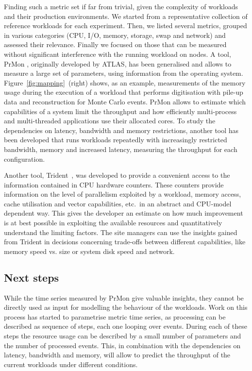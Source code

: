 Finding such a metric set if far from trivial, given the complexity of
workloads and their production environments. We started from a
representative collection of reference workloads for each experiment.
Then, we listed several metrics, grouped in various categories (CPU,
I/O, memory, storage, swap and network) and assessed their
relevance. Finally we focused on those that can be measured without
significant interference with the running workload on nodes. A tool,
PrMon \cite{prmon}, originally developed by ATLAS, has been
generalised and allows to measure a large set of parameters, using
information from the operating
system. Figure~\ref{fig:mapping}~(right) shows, as an example,
measurements of the memory usage during the execution of a workload
that performs digitisation with pile-up data and reconstruction for
Monte Carlo events.  PrMon allows to estimate which capabilities of a
system limit the throughput and how efficiently multi-process and
multi-threaded applications use their allocated cores. To study the
dependencies on latency, bandwidth and memory restrictions, another
tool has been developed that runs workloads repeatedly with
increasingly restricted bandwidth, memory and increased latency,
measuring the throughput for each configuration.

Another tool, Trident~\cite{trident}, was developed to provide a
convenient access to the information contained in CPU hardware
counters.  These counters provide information on the level of
parallelism exploited by a workload, memory access, cache utilisation
and vector capabilities, etc.~in an abstract and CPU-model dependent
way.  This gives the developer an estimate on how much improvement is
at best possible in exploiting the available resources and
quantitatively understand the limiting factors. The site managers can
use the insights gained from Trident in decisions concerning
trade-offs between different capabilities, like memory speed vs. size
or system disk speed and network.

\subsection{Next steps}
While the time series measured by PrMon give valuable insights, they
cannot be directly used as input for modelling the behaviour of the
workloads. Work on this process has started to parametrise metric time
series, as processing can be described as sequence of steps, each one
looping over events. During each of these steps the resource usage can
be described by a small number of parameters and the number of
processed events. This, in combination with the dependencies on
latency, bandwidth and memory, will allow to predict the throughput of
the current workloads under different conditions.

